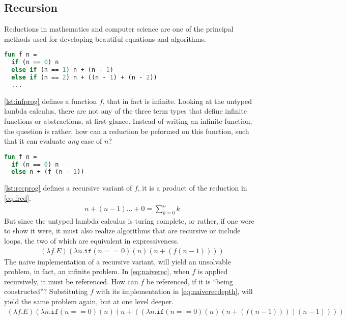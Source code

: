 \documentclass[11pt,oneside,a4paper]{report}
\begin{document}
\subsection{Recursion}
\label{sec:lamrec}
\noindent Reductions in mathematics and computer science are one of the principal methods used for developing beautiful equations and algorithms.
\begin{lstlisting}[language=ML,caption={Infinite program},label={lst:infprog}]
fun f n = 
  if (n == 0) n
  else if (n == 1) n + (n - 1)
  else if (n == 2) n + ((n - 1) + (n - 2))
  ...
\end{lstlisting}
\autoref{lst:infprog} defines a function $f$, that in fact is infinite.
Looking at the untyped lambda calculus, there are not any of the three term types that define infinite functions or abstractions, at first glance.
Instead of writing an infinite function, the question is rather, how can a reduction be peformed on this function, such that it can evaluate \textit{any} case of $n$?
\begin{lstlisting}[language=ML,caption={Recursive program},label={lst:recprog}]
fun f n = 
  if (n == 0) n
  else n + (f (n - 1))
\end{lstlisting}
\autoref{lst:recprog} defines a recursive variant of $f$, it is a product of the reduction in \autoref{eq:fred}.
\begin{align}
    n + (n - 1) \dots + 0 = \sum_{k = 0}^n k
    \label{eq:fred}
\end{align}
But since the untyped lambda calculus is turing complete, or rather, if one were to show it were,
it must also realize algorithms that are recursive or include loops, the two of which are equivalent in expressiveness.
\begin{align}
    (\lambda f . E) (\lambda n . \texttt{if} (n == 0) (n) (n + (f (n - 1))))
    \label{eq:naiverec}
\end{align}
The naive implementation of a recursive variant, will yield an unsolvable problem, in fact, an infinite problem.
In \autoref{eq:naiverec}, when $f$ is applied recursively, it must be referenced.
How can $f$ be referenced, if it is ``being constructed''?
Substituting $f$ with its implementation in \autoref{eq:naiverecdepth}, will yield the same problem again, but at one level deeper.
\begin{align}
    (\lambda f . E) (\lambda n . \texttt{if} (n == 0) (n) (n + ((\lambda n . \texttt{if} (n == 0) (n) (n + (f (n - 1)))) (n - 1))))
    \label{eq:naiverecdepth}
\end{align}
\end{document}

